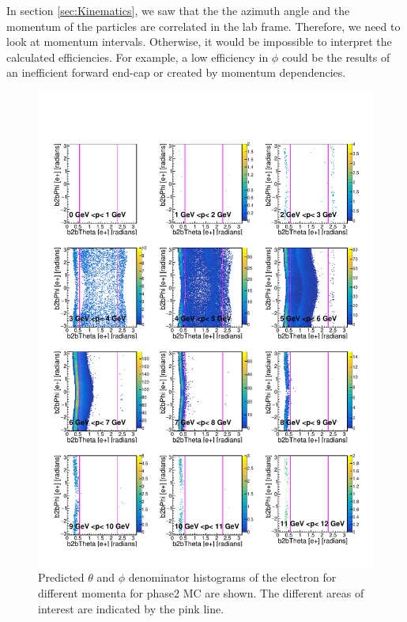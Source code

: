 \documentclass[a4paper,11pt,twosided,final,german,openbib,pdftex,listof=totoc,bibliography=totoc]{scrbook}
\begin{document}
In section \ref{sec:Kinematics}, we saw that the the azimuth angle and the momentum of the particles are correlated in the lab frame. Therefore, we need to look at momentum intervals. Otherwise, it would be impossible to interpret the calculated efficiencies. For example, a low efficiency in $\phi$ could be the results of an inefficient forward end-cap or created by momentum dependencies.

\begin{figure}[h!]
	\includegraphics[width=\textwidth]{Plots/master/RTPMemD_MC.pdf}
	\caption[Denominator $\theta$-$\phi$ Electron Momentum MC]{Predicted $\theta$ and $\phi$ denominator histograms of the electron for different momenta for phase2 MC are shown. The different areas of interest are indicated by the pink line.}
	\label{plt:RTPMemD_MC}
\end{figure}
\end{document}
